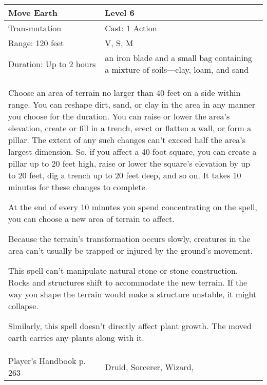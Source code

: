 \documentclass[11pt]{report}
\begin{document}
\begin{table}[H]
	\begin{tabular}{||p{6cm}|p{6cm}||}
		\hline\hline
		\bf{Move Earth} & Level 6\\ \hline
		Transmutation & Cast: 1 Action\\ \hline
		Range: 120 feet & V, S, M\\ \hline
		Duration: Up to 2 hours & an iron blade and a small bag containing a mixture of soils—clay, loam, and sand\\ \hline
		\multicolumn{2}{||p{12cm}||}{Choose an area of terrain no larger than 40 feet on a side within range. You can reshape dirt, sand, or clay in the area in any manner you choose for the duration. You can raise or lower the area’s elevation, create or fill in a trench, erect or flatten a wall, or form a pillar. The extent of any such changes can’t exceed half the area’s largest dimension. So, if you affect a 40-foot square, you can create a pillar up to 20 feet high, raise or lower the square’s elevation by up to 20 feet, dig a trench up to 20 feet deep, and so on. It takes 10 minutes for these changes to complete.

At the end of every 10 minutes you spend concentrating on the spell, you can choose a new area of terrain to affect.

Because the terrain’s transformation occurs slowly, creatures in the area can’t usually be trapped or injured by the ground’s movement.

This spell can’t manipulate natural stone or stone construction. Rocks and structures shift to accommodate the new terrain. If the way you shape the terrain would make a structure unstable, it might collapse.

Similarly, this spell doesn’t directly affect plant growth. The moved earth carries any plants along with it.}\\ \hline
Player's Handbook p. 263 & Druid, Sorcerer, Wizard, \\ \hline\hline
	\end{tabular}
\end{table}
\end{document}
